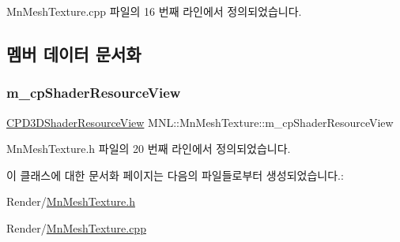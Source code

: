 Mn\+Mesh\+Texture.\+cpp 파일의 16 번째 라인에서 정의되었습니다.



\subsection{멤버 데이터 문서화}
\mbox{\label{class_m_n_l_1_1_mn_mesh_texture_ae2ad2b49f8b76a235dbcda292f6721d5}} 
\subsubsection{\texorpdfstring{m\+\_\+cp\+Shader\+Resource\+View}{m\_cpShaderResourceView}}
{\footnotesize\ttfamily \hyperlink{namespace_m_n_l_a93794d93663474ff79c950ed985565aa}{C\+P\+D3\+D\+Shader\+Resource\+View} M\+N\+L\+::\+Mn\+Mesh\+Texture\+::m\+\_\+cp\+Shader\+Resource\+View\hspace{0.3cm}{\ttfamily [private]}}



Mn\+Mesh\+Texture.\+h 파일의 20 번째 라인에서 정의되었습니다.



이 클래스에 대한 문서화 페이지는 다음의 파일들로부터 생성되었습니다.\+:\begin{DoxyCompactItemize}
\item 
Render/\hyperlink{_mn_mesh_texture_8h}{Mn\+Mesh\+Texture.\+h}\item 
Render/\hyperlink{_mn_mesh_texture_8cpp}{Mn\+Mesh\+Texture.\+cpp}\end{DoxyCompactItemize}
